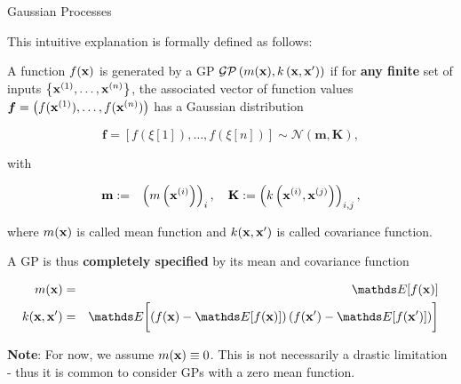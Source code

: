 \documentclass[11pt,compress,t,notes=noshow, xcolor=table]{beamer}
\begin{document}
\begin{vbframe}{Gaussian Processes}

This intuitive explanation is formally defined as follows: 

\lz 

A function $f(\mathbf{x})$ is generated by a GP $\mathcal{GP}\left(m(\mathbf{x}), k\left(\mathbf{x}, \mathbf{x}^{\prime} \right) \right)$ if for \textbf{any finite} set of inputs $\left\{\mathbf{x}^{(1)}, \dots, \mathbf{x}^{(n)}\right\}$, the associated vector of function values $\bm{f} = \left(f(\mathbf{x}^{(1)}), \dots, f(\mathbf{x}^{(n)})\right)$ has a Gaussian distribution

$$
\bm{f} = \left[f\left(\xi[1]\right),\dots, f\left(\xi[n]\right)\right] \sim \mathcal{N}\left(\bm{m}, \bm{K}\right),
$$

with 


\begin{eqnarray*}
\textbf{m} &:=& \left(m\left(\mathbf{x}^{(i)}\right)\right)_{i}, \quad
\textbf{K} := \left(k\left(\mathbf{x}^{(i)}, \mathbf{x}^{(j)}\right)\right)_{i,j}, 
\end{eqnarray*}
 
where $m(\mathbf{x})$ is called mean function and $k(\mathbf{x}, \mathbf{x}^\prime)$ is called covariance function. 


\framebreak 

\vspace*{0.5cm} 

A GP is thus \textbf{completely specified} by its mean and covariance function

\vspace*{-0.2cm}
\begin{eqnarray*}
m(\xv) &=& \E[f(\xv)] \\
k(\xv, \xv^\prime) &=& \E\biggl[\left( f(\xv) - \E[f(\xv)] \right) \left( f(\xv^\prime) - \E[f(\xv^\prime)] \right)\biggr]
\end{eqnarray*}

\vfill

\textbf{Note}: For now, we assume $m(\mathbf{x}) \equiv 0$. This is not necessarily a drastic limitation - thus it is common to consider GPs with a zero mean function. 








\end{vbframe}
\end{document}
